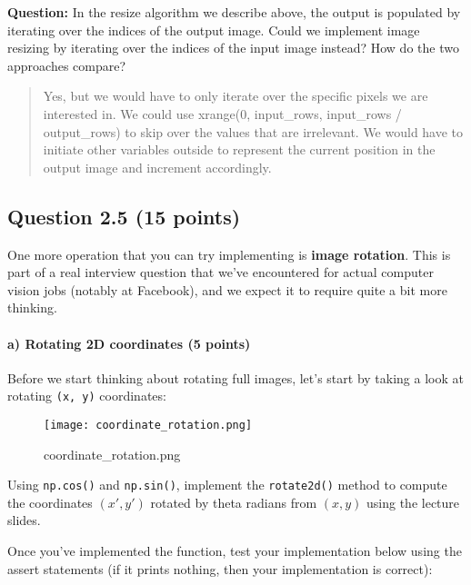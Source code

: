 \documentclass[11pt]{article}
\begin{document}
    \textbf{Question:} In the resize algorithm we describe above, the output
is populated by iterating over the indices of the output image. Could we
implement image resizing by iterating over the indices of the input
image instead? How do the two approaches compare?

\begin{quote}
Yes, but we would have to only iterate over the specific pixels we are
interested in. We could use xrange(0, input\_rows, input\_rows /
output\_rows) to skip over the values that are irrelevant. We would have
to initiate other variables outside to represent the current position in
the output image and increment accordingly.
\end{quote}

    \hypertarget{question-2.5-15-points}{%
\subsection{Question 2.5 (15 points)}\label{question-2.5-15-points}}

One more operation that you can try implementing is \textbf{image
rotation}. This is part of a real interview question that we've
encountered for actual computer vision jobs (notably at Facebook), and
we expect it to require quite a bit more thinking.

    \hypertarget{a-rotating-2d-coordinates-5-points}{%
\paragraph{a) Rotating 2D coordinates (5
points)}\label{a-rotating-2d-coordinates-5-points}}

Before we start thinking about rotating full images, let's start by
taking a look at rotating \texttt{(x,\ y)} coordinates:

\begin{figure}
\centering
\texttt{[image: coordinate\_rotation.png]}
\caption{coordinate\_rotation.png}
\end{figure}

Using \texttt{np.cos()} and \texttt{np.sin()}, implement the
\texttt{rotate2d()} method to compute the coordinates \((x', y')\)
rotated by theta radians from \((x, y)\) using the lecture slides.

Once you've implemented the function, test your implementation below
using the assert statements (if it prints nothing, then your
implementation is correct):
\end{document}
